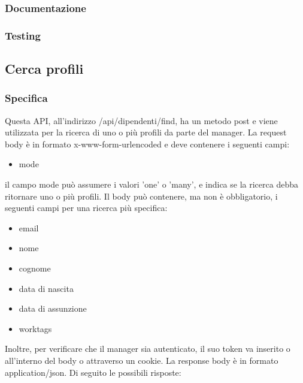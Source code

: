 \documentclass{report}
\begin{document}
		\subsubsection*{Documentazione}

		\subsubsection*{Testing}

	\subsection*{Cerca profili}
		\subsubsection*{Specifica}
		Questa API, all'indirizzo /api/dipendenti/find, ha un metodo post e viene utilizzata per la ricerca di uno o più profili da parte del manager.
		La request body è in formato x-www-form-urlencoded e deve contenere i seguenti campi:
		\begin{itemize}
			\item mode
		\end{itemize}
		il campo mode può assumere i valori 'one' o 'many', e indica se la ricerca debba ritornare uno o più profili.
		Il body può contenere, ma non è obbligatorio, i seguenti campi per una ricerca più specifica:
		\begin{itemize}
			\item email
			\item nome
			\item cognome
			\item data di nascita
			\item data di assunzione
			\item worktags
		\end{itemize}
		Inoltre, per verificare che il manager sia autenticato, il suo token va inserito o all'interno del body o attraverso un cookie.
		La response body è in formato application/json. Di seguito le possibili risposte:
\end{document}
